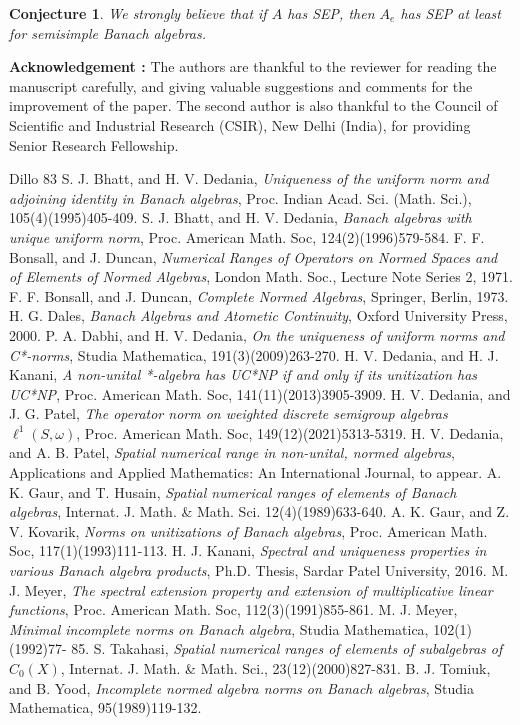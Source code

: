 \documentclass{amsart}
\theoremstyle{plain}
\newtheorem{conjec}[defn]{Conjecture}
\numberwithin{equation}{section}
\begin{document}
\begin{conjec}
We strongly believe that if $A$ has SEP, then $A_e$ has SEP at least for semisimple Banach algebras.
\end{conjec}

\noindent
\textbf{Acknowledgement :} {The authors are thankful to the reviewer for reading the manuscript carefully, and giving valuable suggestions and comments for the improvement of the paper. The second author is also  thankful to the Council of Scientific and Industrial Research (CSIR), New Delhi (India), for providing Senior Research Fellowship.}

\begin{thebibliography}{Dillo 83}
 S. J. Bhatt, and H. V. Dedania, \emph{Uniqueness of the uniform norm and adjoining identity in Banach algebras}, Proc. Indian Acad. Sci. (Math. Sci.), 105(4)(1995)405-409.
 S. J. Bhatt, and H. V. Dedania, \emph{Banach algebras with unique uniform norm}, Proc. American Math. Soc, 124(2)(1996)579-584.
 F. F. Bonsall, and J. Duncan, \emph{Numerical Ranges of Operators on Normed Spaces and of Elements of Normed Algebras}, London Math. Soc., Lecture Note Series 2, 1971.
 F. F. Bonsall, and J. Duncan, \emph{Complete Normed Algebras}, Springer, Berlin, 1973.
 H. G. Dales, \emph{Banach Algebras and Atometic Continuity}, Oxford University Press, 2000.
 P. A. Dabhi, and H. V. Dedania, \emph{On the uniqueness of uniform norms and C*-norms}, Studia Mathematica, 191(3)(2009)263-270.
 H. V. Dedania, and H. J. Kanani, \emph{A non-unital *-algebra has UC*NP if and only if its unitization has UC*NP}, Proc. American Math. Soc, 141(11)(2013)3905-3909.
 H. V. Dedania, and J. G. Patel, \emph{The operator norm on weighted discrete semigroup algebras $\ell^1(S, \omega)$}, Proc. American Math. Soc, 149(12)(2021)5313-5319.
 H. V. Dedania, and A. B. Patel, \emph{Spatial numerical range in non-unital, normed algebras}, Applications and Applied Mathematics: An International Journal, to appear.
 A. K. Gaur, and T. Husain, \emph{Spatial numerical ranges of elements of Banach algebras}, Internat. J. Math. \& Math. Sci. 12(4)(1989)633-640.
 A. K. Gaur, and Z. V. Kovarik, \emph{Norms on unitizations of Banach algebras}, Proc. American Math. Soc, 117(1)(1993)111-113.
 H. J. Kanani, \emph{Spectral and uniqueness properties in various Banach algebra products}, Ph.D. Thesis, Sardar Patel University, 2016.
 M. J. Meyer, \emph{The spectral extension property and extension of multiplicative linear functions}, Proc. American Math. Soc, 112(3)(1991)855-861.
 M. J. Meyer, \emph{Minimal incomplete norms on Banach algebra}, Studia Mathematica, 102(1)(1992)77- 85.
 S. Takahasi, \emph{Spatial numerical ranges of elements of subalgebras of $C_0(X)$}, Internat. J. Math. \& Math. Sci., 23(12)(2000)827-831.
 B. J. Tomiuk, and B. Yood, \emph{Incomplete normed algebra norms on Banach algebras}, Studia Mathematica, 95(1989)119-132.
\end{thebibliography}
\end{document}
